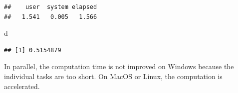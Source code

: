 \documentclass[
  12pt,
  american,
  a4paper,
  extrafontsizes,onecolumn,openright
  ]{memoir}
\newenvironment{Shaded}{\begin{snugshade}}{\end{snugshade}}
\newcommand{\ControlFlowTok}[1]{\textcolor[rgb]{0.13,0.29,0.53}{\textbf{#1}}}
\newcommand{\DecValTok}[1]{\textcolor[rgb]{0.00,0.00,0.81}{#1}}
\newcommand{\FunctionTok}[1]{\textcolor[rgb]{0.13,0.29,0.53}{\textbf{#1}}}
\newcommand{\NormalTok}[1]{#1}
\newcommand{\OtherTok}[1]{\textcolor[rgb]{0.56,0.35,0.01}{#1}}
\newcommand{\SpecialCharTok}[1]{\textcolor[rgb]{0.81,0.36,0.00}{\textbf{#1}}}
\begin{document}
\scriptsize

\begin{Shaded}
\end{Shaded}

\begin{verbatim}
##    user  system elapsed 
##   1.541   0.005   1.566
\end{verbatim}

\begin{Shaded}
\begin{Highlighting}[]
\NormalTok{d}
\end{Highlighting}
\end{Shaded}

\begin{verbatim}
## [1] 0.5154879
\end{verbatim}

\normalsize

In parallel, the computation time is not improved on Windows because the individual tasks are too short.
On MacOS or Linux, the computation is accelerated.
\end{document}
